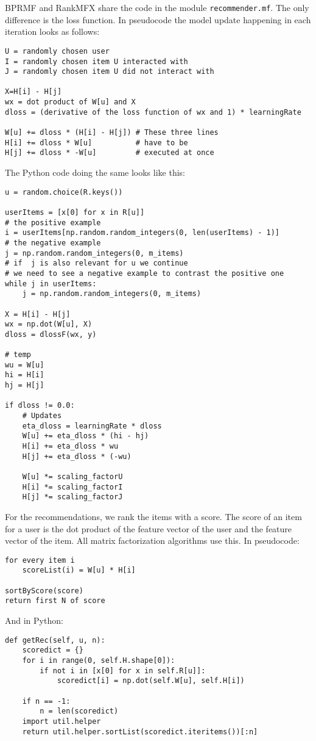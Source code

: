 BPRMF and RankMFX share the code in the module \lstinline!recommender.mf!. 
The only difference is the loss function.
In pseudocode the model update happening in each iteration looks as follows:
\begin{lstlisting}[style=pseudocode]
U = randomly chosen user
I = randomly chosen item U interacted with
J = randomly chosen item U did not interact with

X=H[i] - H[j]
wx = dot product of W[u] and X
dloss = (derivative of the loss function of wx and 1) * learningRate

W[u] += dloss * (H[i] - H[j]) # These three lines
H[i] += dloss * W[u]          # have to be
H[j] += dloss * -W[u]         # executed at once
\end{lstlisting}
The Python code doing the same looks like this:
\begin{lstlisting}[style=python]
u = random.choice(R.keys())

userItems = [x[0] for x in R[u]]
# the positive example
i = userItems[np.random.random_integers(0, len(userItems) - 1)]
# the negative example
j = np.random.random_integers(0, m_items)
# if  j is also relevant for u we continue
# we need to see a negative example to contrast the positive one
while j in userItems:
    j = np.random.random_integers(0, m_items)

X = H[i] - H[j]
wx = np.dot(W[u], X)
dloss = dlossF(wx, y)

# temp
wu = W[u]
hi = H[i]
hj = H[j]

if dloss != 0.0:
    # Updates
    eta_dloss = learningRate * dloss
    W[u] += eta_dloss * (hi - hj)
    H[i] += eta_dloss * wu
    H[j] += eta_dloss * (-wu)

    W[u] *= scaling_factorU
    H[i] *= scaling_factorI
    H[j] *= scaling_factorJ
\end{lstlisting}
For the recommendations, we rank the items with a score.
The score of an item for a user is the dot
product of the feature vector of the user 
and the feature vector of the item. All matrix factorization
algorithms use this.
In pseudocode:
\begin{lstlisting}[style=pseudocode]
for every item i
    scoreList(i) = W[u] * H[i]

sortByScore(score)
return first N of score
\end{lstlisting}
And in Python:
\begin{lstlisting}[style=python]
def getRec(self, u, n):
    scoredict = {}
    for i in range(0, self.H.shape[0]):
        if not i in [x[0] for x in self.R[u]]:
            scoredict[i] = np.dot(self.W[u], self.H[i])

    if n == -1:
        n = len(scoredict)
    import util.helper
    return util.helper.sortList(scoredict.iteritems())[:n]
\end{lstlisting}


